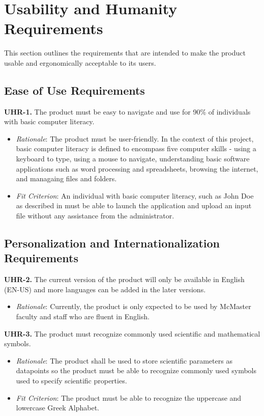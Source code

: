 \documentclass[12pt]{article}
\begin{document}
\section{Usability and Humanity Requirements}
This section outlines the requirements that are intended to make the product usable and ergonomically acceptable to its users.
\subsection{Ease of Use Requirements}
\textbf{UHR-1.} The product must be easy to navigate and use for 90\% of individuals with basic computer literacy.
\begin{itemize}
  \item \emph{Rationale}: The product must be user-friendly. In the context of this project, basic computer literacy is defined to encompass five computer skills - using a keyboard
  to type, using a mouse to navigate, understanding basic software applications such as word processing and spreadsheets, browsing the internet, and managaing files and folders.
  \item \emph{Fit Criterion}: An individual with basic computer literacy, such as John Doe as described in  must be able to launch the application and upload an input file
  without any assistance from the administrator.
\end{itemize}

\subsection{Personalization and Internationalization Requirements}
\textbf{UHR-2.} The current version of the product will only be available in English (EN-US) and more languages can be added in the later versions.
\begin{itemize}
  \item \emph{Rationale}: Currently, the product is only expected to be used by McMaster faculty and staff who are fluent in English.
\end{itemize}
\bigskip
\textbf{UHR-3.} The product must recognize commonly used scientific and mathematical symbols.
\begin{itemize}
  \item \emph{Rationale}: The product shall be used to store scientific parameters as datapoints so the product must be able to recognize commonly used symbols used to specify scientific properties.
  \item \emph{Fit Criterion}: The product must be able to recognize the uppercase and lowercase Greek Alphabet.
\end{itemize}
\end{document}
